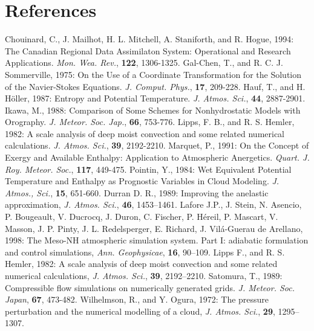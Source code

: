\section{References}
\por
Chouinard, C., J. Mailhot, H. L. Mitchell, A. Staniforth, and R. Hogue, 1994:
The Canadian Regional Data Assimilaton System: Operational and Research
Applications. {\it Mon. Wea. Rev.}, {\bf 122}, 1306-1325.
\por
Gal-Chen, T., and R. C. J. Sommerville, 1975: On the Use of a Coordinate
Transformation for the Solution of the Navier-Stokes Equations. {\it J. Comput.
Phys.}, {\bf 17}, 209-228.
\por
Hauf, T., and H. H\"oller, 1987: Entropy and Potential Temperature. {\it J. Atmos.
Sci.}, {\bf 44}, 2887-2901.
\por
Ikawa, M., 1988: Comparison of Some Schemes for Nonhydrostatic Models with
Orography. {\it J. Meteor. Soc. Jap.}, {\bf 66}, 753-776.
\por
Lipps, F. B., and R. S. Hemler, 1982: A scale analysis of deep moist convection
and some related numerical calculations. {\it J. Atmos. Sci.}, {\bf 39}, 2192-2210.
\por
Marquet, P., 1991: On the Concept of Exergy and Available Enthalpy: Application
to Atmospheric Anergetics. {\it Quart. J. Roy. Meteor. Soc.}, {\bf 117}, 449-475.
\por
Pointin, Y., 1984: Wet Equivalent Potential Temperature and Enthalpy as
Prognostic Variables in Cloud Modeling. {\it J. Atmos., Sci.}, {\bf 15}, 651-660.
\por
Durran D. R., 1989: Improving the anelastic approximation, {\it J. Atmos. Sci.}, {\bf 46}, 1453--1461.
\por
Lafore J.P., J. Stein, N. Asencio, P. Bougeault, V. Ducrocq, J. Duron, C. Fischer, P. H\'ereil,
P. Mascart, V. Masson, J. P. Pinty, J. L. Redelsperger, E. Richard, J. Vil\'a-Guerau de
Arellano, 1998: The Meso-NH atmospheric simulation system. Part I: adiabatic formulation and
control simulations, {\it Ann. Geophysicae}, {\bf 16}, 90--109.
\por
Lipps F., and R. S. Hemler, 1982: A scale analysis of deep moist convection and some related
numerical calculations, {\it J. Atmos. Sci.}, {\bf 39}, 2192--2210.
\por
Satomura, T., 1989: Compressible flow simulations on numerically generated grids. {\it J. Meteor. Soc. Japan}, {\bf 67}, 473-482. 
\por
Wilhelmson, R., and Y. Ogura, 1972: The pressure perturbation and the numerical modelling of a
cloud, {\it J. Atmos. Sci.}, {\bf 29}, 1295--1307.

